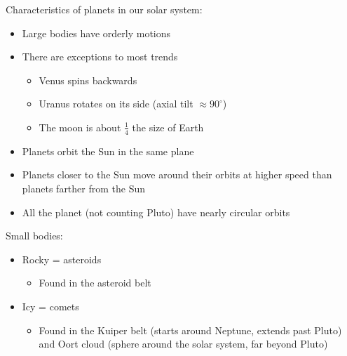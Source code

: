 \documentclass[12pt]{article}
\begin{document}
Characteristics of planets in our solar system:
\begin{itemize}
    \item Large bodies have orderly motions
    \item There are exceptions to most trends
    \begin{itemize}
        \item Venus spins backwards
        \item Uranus rotates on its side (axial tilt $\approx 90^\circ$)
        \item The moon is about $\frac{1}{4}$ the size of Earth
    \end{itemize}
    \item Planets orbit the Sun in the same plane
    \item Planets closer to the Sun move  around their orbits at higher speed than planets farther from the Sun
    \item All the planet (not counting Pluto) have nearly circular orbits
\end{itemize}

Small bodies:
\begin{itemize}
    \item Rocky = asteroids
    \begin{itemize}
        \item Found in the asteroid belt
    \end{itemize}
    \item Icy = comets
    \begin{itemize}
        \item Found in the Kuiper belt (starts around Neptune, extends past Pluto) and Oort cloud (sphere around the solar system, far beyond Pluto)
    \end{itemize}
\end{itemize}
\end{document}
